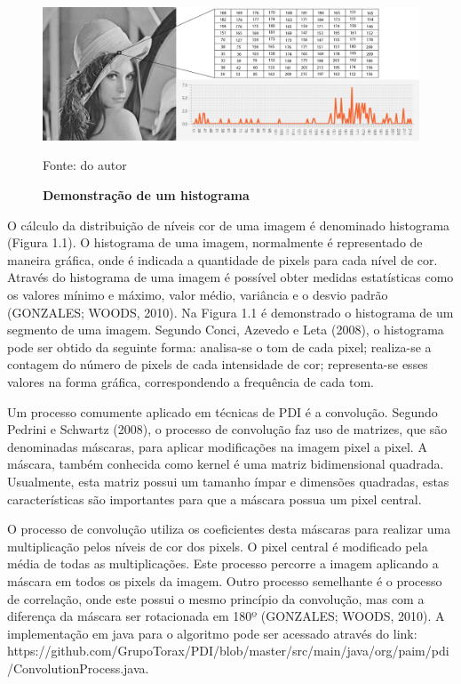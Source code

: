 \documentclass[
	12pt,				%
	oneside,			%
	a4paper,			%
	english,			%
	french,				%
	spanish,			%
	brazil,				%
	]{abntex2}
\begin{document}
\begin{figure}[ht]
\centering
\label{fig:histograma}
\caption{\textbf{Demonstração de um histograma}}
\includegraphics[width=1\textwidth]{imagens/histograma.png}

Fonte: do autor
\end{figure}

O cálculo da distribuição de níveis cor de uma imagem é denominado histograma (Figura 1.1). O histograma de uma imagem, normalmente é representado de maneira gráfica, onde é indicada a quantidade de pixels para cada nível de cor. Através do histograma de uma imagem é possível obter medidas estatísticas como os valores mínimo e máximo, valor médio, variância e o desvio padrão (GONZALES; WOODS, 2010). Na Figura 1.1 é demonstrado o histograma de um segmento de uma imagem. 
Segundo Conci, Azevedo e Leta (2008), o histograma pode ser obtido da seguinte forma: analisa-se o tom de cada pixel; realiza-se a contagem do número de pixels de cada intensidade de cor; representa-se esses valores na forma gráfica, correspondendo a frequência de cada tom.

Um processo comumente aplicado em técnicas de PDI é a convolução. Segundo Pedrini e Schwartz (2008), o processo de convolução faz uso de matrizes, que são denominadas máscaras, para aplicar modificações na imagem pixel a pixel. A máscara, também conhecida como kernel é uma matriz bidimensional quadrada. Usualmente, esta matriz possui um tamanho ímpar e dimensões quadradas, estas características são importantes para que a máscara possua um pixel central.

O processo de convolução utiliza os coeficientes desta máscaras para realizar uma multiplicação pelos níveis de cor dos pixels. O pixel central é modificado pela média de todas as multiplicações. Este processo percorre a imagem aplicando a máscara em todos os pixels da imagem. Outro processo semelhante é o processo de correlação, onde este possui o mesmo princípio da convolução, mas com a diferença da máscara ser rotacionada em 180º (GONZALES; WOODS, 2010). A implementação em java para o algoritmo pode ser acessado através do link: https://github.com/GrupoTorax/PDI/blob/master/src/main/java/org/paim/pdi/ConvolutionProcess.java.
\end{document}
